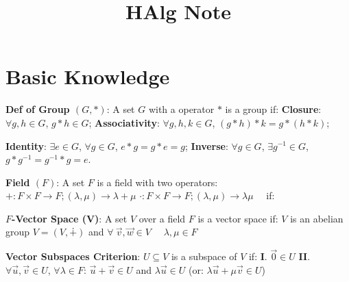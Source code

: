 \documentclass[9pt]{article}
\title{HAlg Note}
\author{}
\date{}
\begin{document}
\maketitle
\thispagestyle{fancy}
\vspace{-3.5cm}

\fontsize{10pt}{11pt}\selectfont
\setlength{\parindent}{8pt}


\section{Basic Knowledge} %

\textbf{Def of Group $(G,*)$}: {\small A set $G$ with a operator $*$ is a group if: \textbf{Closure}: $\forall g,h\in G$, $g*h\in G$; \textbf{Associativity}: $\forall g,h,k\in G$, $(g*h)*k=g*(h*k)$;}

\hspace{85pt} {\small \textbf{Identity}: $\exists e\in G$, $\forall g\in G$, $e*g=g*e=g$; \textbf{Inverse}: $\forall g\in G$, $\exists g^{-1}\in G$, $g*g^{-1}=g^{-1}*g=e$.} 

\textbf{Field $(F)$}: {\small A set $F$ is a field with two operators: $+:F\times F\to F;(\lambda,\mu)\to\lambda+\mu$ $\cdot:F\times F\to F;(\lambda,\mu)\to\lambda\mu$ \ \ if:}

\quad \quad \quad {}

\textbf{$F$-Vector Space (V)}: {\small A set $V$ over a field $F$ is a vector space if: \quad $V$ is an abelian group $V=(V,\dotplus)$ and $\forall \ \vec{v},\vec{w}\in V$ \ \ $\lambda,\mu\in F$}

\quad \quad \quad {}

\textbf{Vector Subspaces Criterion}: {\small $U\subseteq V$ is a subspace of $V$ if: \quad \textbf{I}. $\vec{0}\in U$ \quad \textbf{II}. $\forall \vec{u},\vec{v}\in U$, $\forall \lambda\in F$: $\vec{u}+\vec{v}\in U$ and $\lambda\vec{u}\in U$ \quad (or: $\lambda\vec{u}+\mu\vec{v}\in U$)}
\end{document}
